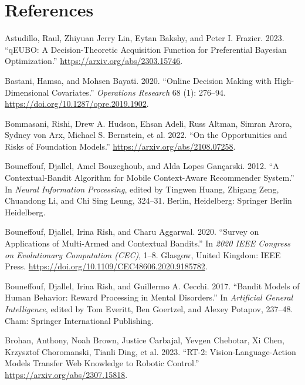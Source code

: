 \documentclass[
  letterpaper,
  numbers=noenddot,
  DIV=11]{scrreprt}
\newlength{\cslhangindent}
\newenvironment{CSLReferences}[2] %
 {\begin{list}{}{%
  \setlength{\itemindent}{0pt}
  \setlength{\leftmargin}{0pt}
  \setlength{\parsep}{0pt}
  \ifodd #1
   \setlength{\leftmargin}{\cslhangindent}
   \setlength{\itemindent}{-1\cslhangindent}
  \fi
  \setlength{\itemsep}{#2\baselineskip}}}
 {\end{list}}
\theoremstyle{plain}
\theoremstyle{definition}
\theoremstyle{remark}
\begin{document}
\section*{References}\label{bibliography-4}


\label{refs-4}
\begin{CSLReferences}{1}{0}
Astudillo, Raul, Zhiyuan Jerry Lin, Eytan Bakshy, and Peter I. Frazier.
2023. {``qEUBO: A Decision-Theoretic Acquisition Function for
Preferential Bayesian Optimization.''}
\url{https://arxiv.org/abs/2303.15746}.

Bastani, Hamsa, and Mohsen Bayati. 2020. {``Online Decision Making with
High-Dimensional Covariates.''} \emph{Operations Research} 68 (1):
276--94. \url{https://doi.org/10.1287/opre.2019.1902}.

Bommasani, Rishi, Drew A. Hudson, Ehsan Adeli, Russ Altman, Simran
Arora, Sydney von Arx, Michael S. Bernstein, et al. 2022. {``On the
Opportunities and Risks of Foundation Models.''}
\url{https://arxiv.org/abs/2108.07258}.

Bouneffouf, Djallel, Amel Bouzeghoub, and Alda Lopes Gançarski. 2012.
{``A Contextual-Bandit Algorithm for Mobile Context-Aware Recommender
System.''} In \emph{Neural Information Processing}, edited by Tingwen
Huang, Zhigang Zeng, Chuandong Li, and Chi Sing Leung, 324--31. Berlin,
Heidelberg: Springer Berlin Heidelberg.

Bouneffouf, Djallel, Irina Rish, and Charu Aggarwal. 2020. {``Survey on
Applications of Multi-Armed and Contextual Bandits.''} In \emph{2020
IEEE Congress on Evolutionary Computation (CEC)}, 1--8. Glasgow, United
Kingdom: IEEE Press.
\url{https://doi.org/10.1109/CEC48606.2020.9185782}.

Bouneffouf, Djallel, Irina Rish, and Guillermo A. Cecchi. 2017.
{``Bandit Models of Human Behavior: Reward Processing in Mental
Disorders.''} In \emph{Artificial General Intelligence}, edited by Tom
Everitt, Ben Goertzel, and Alexey Potapov, 237--48. Cham: Springer
International Publishing.

Brohan, Anthony, Noah Brown, Justice Carbajal, Yevgen Chebotar, Xi Chen,
Krzysztof Choromanski, Tianli Ding, et al. 2023. {``RT-2:
Vision-Language-Action Models Transfer Web Knowledge to Robotic
Control.''} \url{https://arxiv.org/abs/2307.15818}.


\end{CSLReferences}
\end{document}
